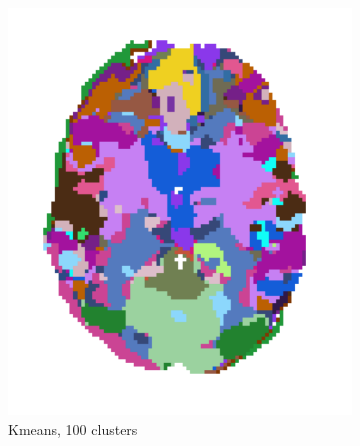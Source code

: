 \documentclass{article} %
\begin{document}
\begin{figure}

\begin{preview}
      \begin{subfigure}[b]{.26\linewidth}
        \includegraphics[width=\linewidth]{kmeans_100}%
	\vspace*{-1.6em}
        \caption{\footnotesize\sffamily\hspace*{-.9ex}Kmeans, 100 clusters}
      \end{subfigure}%
      \begin{subfigure}[b]{.26\linewidth}

\end{subfigure}
\end{preview}
\end{figure}
\end{document}
